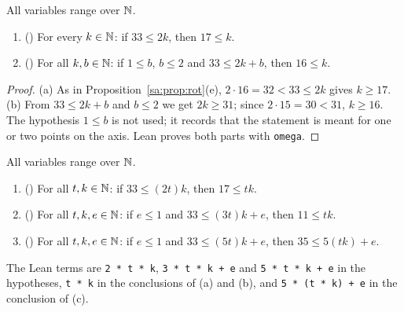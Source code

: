 \begin{proposition}\label{sa:prop:mirror}
All variables range over $\mathbb N$.
\begin{enumerate}[label=(\alph*)]
\item \textup{(}\textup{)} For every $k\in\mathbb N$: if $33\le2k$, then $17\le k$.
\item \textup{(}\textup{)} For all $k,b\in\mathbb N$: if $1\le b$, $b\le2$ and $33\le2k+b$,
  then $16\le k$.
\end{enumerate}
\end{proposition}

\begin{proof}
(a) As in Proposition~\ref{sa:prop:rot}(e), $2\cdot16=32<33\le2k$ gives $k\ge17$.
(b) From $33\le2k+b$ and $b\le2$ we get $2k\ge31$; since $2\cdot15=30<31$, $k\ge16$. The hypothesis $1\le b$ is not
used; it records that the statement is meant for one or two points on the axis. Lean proves both parts with
\texttt{omega}.
\end{proof}

\begin{proposition}\label{sa:prop:order}
All variables range over $\mathbb N$.
\begin{enumerate}[label=(\alph*)]
\item \textup{(}\textup{)} For all $t,k\in\mathbb N$: if $33\le(2t)k$, then $17\le tk$.
\item \textup{(}\textup{)} For all $t,k,e\in\mathbb N$: if $e\le1$ and $33\le(3t)k+e$, then
  $11\le tk$.
\item \textup{(}\textup{)} For all $t,k,e\in\mathbb N$: if $e\le1$ and $33\le(5t)k+e$, then
  $35\le5(tk)+e$.
\end{enumerate}
The Lean terms are \mbox{\texttt{2 * t * k}}, \mbox{\texttt{3 * t * k + e}} and \mbox{\texttt{5 * t * k + e}} in the
hypotheses, \mbox{\texttt{t * k}} in the conclusions of \textup{(a)} and \textup{(b)}, and
\mbox{\texttt{5 * (t * k) + e}} in the conclusion of \textup{(c)}.
\end{proposition}

